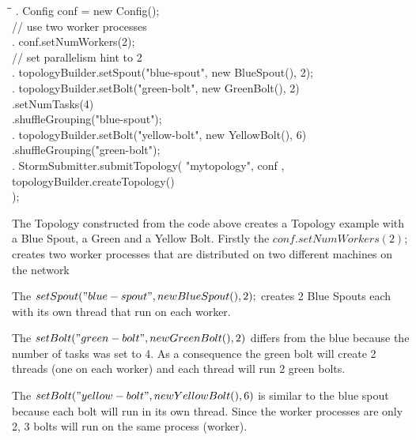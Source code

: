 \documentclass{lmproj}
\begin{document}
\begin{tabbing}
	\hspace*{2cm}\=\hspace*{1cm}\= \kill
	. \> Config conf = new Config(); \\
	\>    \> // use two worker processes  \\
	. \> conf.setNumWorkers(2); \\
	\>    \> // set parallelism hint to 2 \\
	. \> topologyBuilder.setSpout("blue-spout", new BlueSpout(), 2); \\
	. \> topologyBuilder.setBolt("green-bolt", new GreenBolt(), 2) \\
	\>    \>  \hspace*{2cm} .setNumTasks(4) \\
	\>    \>  \hspace*{2cm} .shuffleGrouping("blue-spout"); \\
	. \> topologyBuilder.setBolt("yellow-bolt", new YellowBolt(), 6) \\
	\>    \>  \hspace*{2cm} .shuffleGrouping("green-bolt"); \\
	. \> StormSubmitter.submitTopology(  "mytopology", conf , \\
	\>    \>  \hspace*{2cm} topologyBuilder.createTopology() \\
	\>    \>  \hspace*{2cm} ); \\
		
\end{tabbing}

The Topology constructed from the code above creates a Topology example with a Blue Spout, a Green and a Yellow Bolt. Firstly the $conf.setNumWorkers(2);$ \space [2] creates two worker processes that are distributed on two different machines on the network

The $setSpout("blue-spout", new BlueSpout(), 2);$ \space [3] creates 2 Blue Spouts each with its own thread that run on each worker.

The $setBolt("green-bolt", new GreenBolt(), 2)$ \space [4] differs from the blue because the number of tasks was set to 4. As a consequence the green bolt will create 2 threads (one on each worker) and each thread will run 2 green bolts.

The $setBolt("yellow-bolt", new YellowBolt(), 6)$ \space [5] is similar to the blue spout because each bolt will run in its own thread. Since the worker processes are only 2, 3 bolts will run on the same process (worker). 
\end{document}
